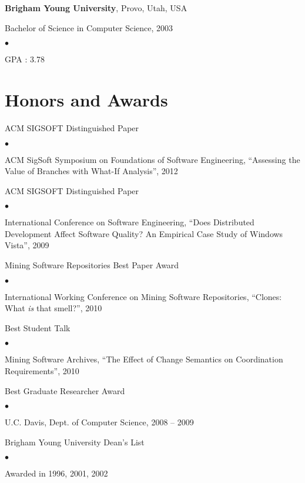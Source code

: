 \documentclass[margin,line,article,letterpaper]{res}
\newenvironment{list1}{
  \begin{list}{}{%
      \setlength{\itemsep}{0in}
      \setlength{\parsep}{0in} \setlength{\parskip}{0in}
      \setlength{\topsep}{0in} \setlength{\partopsep}{0in} 
      \setlength{\leftmargin}{0.17in}}}{\end{list}}
\newenvironment{list2}{
  \begin{list}{$\bullet$}{%
      \setlength{\itemsep}{0in}
      \setlength{\parsep}{0in} \setlength{\parskip}{0in}
      \setlength{\topsep}{0in} \setlength{\partopsep}{0in} 
      \setlength{\leftmargin}{0.2in}}}{\end{list}}
\begin{document}
\begin{resume}
\textbf{Brigham Young University}, Provo, Utah, USA
\begin{list1}
\item Bachelor of Science in Computer Science, 2003
\begin{list2}
\vspace*{.05in}
\item GPA : 3.78
\end{list2}
\end{list1}


\section{Honors and Awards} 

ACM SIGSOFT Distinguished Paper
\begin{list2}
\item ACM SigSoft Symposium on Foundations of Software Engineering, ``Assessing the Value of Branches with What-If Analysis'', 2012
\end{list2}

ACM SIGSOFT Distinguished Paper
\begin{list2}
\item International Conference on Software Engineering, ``Does Distributed Development
Affect Software Quality?  An Empirical Case Study of Windows Vista'', 2009
\end{list2}

Mining Software Repositories Best Paper Award
\begin{list2}
\item International Working Conference on Mining Software Repositories, ``Clones: What \emph{is} that smell?'', 2010
\end{list2}

Best Student Talk
\begin{list2}
\item Mining Software Archives, ``The Effect of Change Semantics on Coordination Requirements'', 2010
\end{list2}

Best Graduate Researcher Award
\begin{list2}
\item U.C. Davis, Dept. of Computer Science, 2008 -- 2009
\end{list2}


Brigham Young University Dean's List
\begin{list2}
\item Awarded in 1996, 2001, 2002
\end{list2}


\end{resume}
\end{document}
